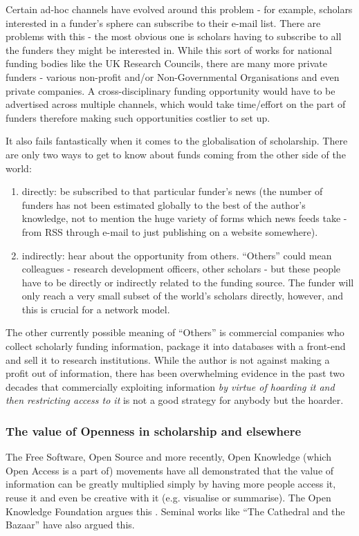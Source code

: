 \documentclass[11pt,fleqn,twoside]{article}
\begin{document}
Certain ad-hoc channels have evolved around this problem - for example, scholars interested in a funder's sphere can subscribe to their e-mail list. There are problems with this - the most obvious one is scholars having to subscribe to all the funders they might be interested in. While this sort of works for national funding bodies like the UK Research Councils, there are many more private funders - various non-profit and/or Non-Governmental Organisations and even private companies. A cross-disciplinary funding opportunity would have to be advertised across multiple channels, which would take time/effort on the part of funders therefore making such opportunities costlier to set up.

It also fails fantastically when it comes to the globalisation of scholarship. There are only two ways to get to know about funds coming from the other side of the world:
\begin{enumerate}
	\item directly: be subscribed to that particular funder's news (the number of funders has not been estimated globally to the best of the author's knowledge, not to mention the huge variety of forms which news feeds take - from RSS through e-mail to just publishing on a website somewhere).
	\item indirectly: hear about the opportunity from others. ``Others'' could mean colleagues - research development officers, other scholars - but these people have to be directly or indirectly related to the funding source. The funder will only reach a very small subset of the world's scholars directly, however, and this is crucial for a network model.
\end{enumerate}

The other currently possible meaning of ``Others'' is commercial companies who collect scholarly funding information, package it into databases with a front-end and sell it to research institutions. While the author is not against making a profit out of information, there has been overwhelming evidence in the past two decades that commercially exploiting information \emph{by virtue of hoarding it and then restricting access to it} is not a good strategy for anybody but the hoarder.

\subsubsection{The value of Openness in scholarship and elsewhere}
The Free Software, Open Source and more recently, Open Knowledge (which Open Access is a part of) movements have all demonstrated that the value of information can be greatly multiplied simply by having more people access it, reuse it and even be creative with it (e.g. visualise or summarise). The Open Knowledge Foundation argues this \cite{okfn-vision}. Seminal works like ``The Cathedral and the Bazaar'' \cite{catb} have also argued this.
\end{document}

